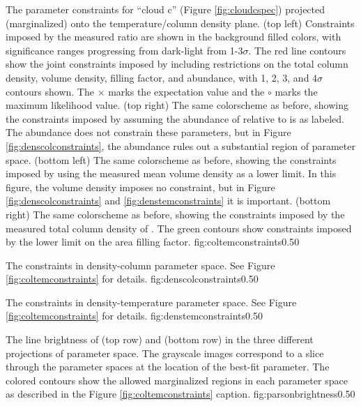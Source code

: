 {The parameter constraints for ``cloud c'' (Figure \ref{fig:cloudcspec})
projected (marginalized) onto the temperature/column density plane.\newline
(top left) Constraints imposed by the measured ratio \Rone are shown in the
background filled colors,
with significance ranges progressing from dark-light from 1-3$\sigma$.  The
red line contours show the joint constraints imposed by including
restrictions on the
total column density, volume density,  filling factor, and abundance, with
1, 2, 3, and 4$\sigma$ contours shown.
The $\times$ marks the expectation value and the $\circ$ marks the maximum
likelihood value.
\newline
(top right) The same colorscheme as before, showing the constraints imposed by
assuming the abundance of \para relative to \hh is as labeled.  
The abundance does not constrain these parameters, but in Figure
\ref{fig:denscolconstraints}, the abundance rules out a substantial region of parameter
space.
\newline
(bottom left) The same colorscheme as before, showing the constraints imposed
by using the measured mean volume density as a lower limit.  In this figure,
the volume density imposes no constraint, but in Figure \ref{fig:denscolconstraints}
and \ref{fig:denstemconstraints} it is important.
\newline
(bottom right) The same colorscheme as before, showing the constraints imposed
by the measured total column density of \hh.  The green contours show
constraints imposed by the lower limit on the area filling factor.}
{fig:coltemconstraints}{0.5}{0}

{The constraints in density-column parameter space.
See Figure \ref{fig:coltemconstraints} for details.}
{fig:denscolconstraints}{0.5}{0}

{The constraints in density-temperature parameter space.
See Figure \ref{fig:coltemconstraints} for details.}
{fig:denstemconstraints}{0.5}{0}

{The line brightness of \para \threeohthree (top row) and \para \threetwoone
(bottom row) in the three different projections of parameter space.  The
grayscale images correspond to a slice through the parameter spaces at the
location of the best-fit parameter.  The colored contours show the allowed
marginalized regions in each parameter space as described in the
Figure \ref{fig:coltemconstraints} caption.}
{fig:parsonbrightness}{0.5}{0}

